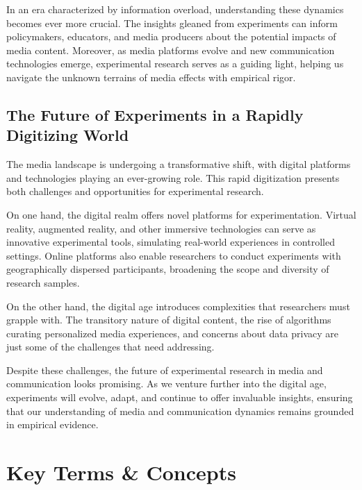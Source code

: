 \documentclass[
  b5paper]{book}
\begin{document}
In an era characterized by information overload, understanding these dynamics becomes ever more crucial. The insights gleaned from experiments can inform policymakers, educators, and media producers about the potential impacts of media content. Moreover, as media platforms evolve and new communication technologies emerge, experimental research serves as a guiding light, helping us navigate the unknown terrains of media effects with empirical rigor.

\hypertarget{the-future-of-experiments-in-a-rapidly-digitizing-world}{%
\subsection*{The Future of Experiments in a Rapidly Digitizing World}\label{the-future-of-experiments-in-a-rapidly-digitizing-world}}

The media landscape is undergoing a transformative shift, with digital platforms and technologies playing an ever-growing role. This rapid digitization presents both challenges and opportunities for experimental research.

On one hand, the digital realm offers novel platforms for experimentation. Virtual reality, augmented reality, and other immersive technologies can serve as innovative experimental tools, simulating real-world experiences in controlled settings. Online platforms also enable researchers to conduct experiments with geographically dispersed participants, broadening the scope and diversity of research samples.

On the other hand, the digital age introduces complexities that researchers must grapple with. The transitory nature of digital content, the rise of algorithms curating personalized media experiences, and concerns about data privacy are just some of the challenges that need addressing.

Despite these challenges, the future of experimental research in media and communication looks promising. As we venture further into the digital age, experiments will evolve, adapt, and continue to offer invaluable insights, ensuring that our understanding of media and communication dynamics remains grounded in empirical evidence.

\hypertarget{key-terms-concepts}{%
\section{Key Terms \& Concepts}\label{key-terms-concepts}}
\end{document}
